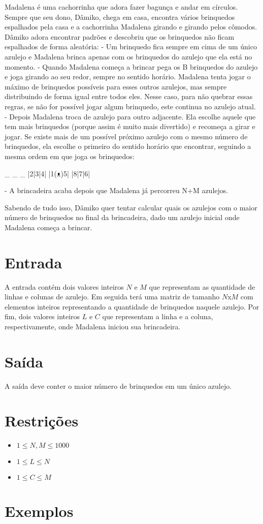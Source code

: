 Madalena é uma cachorrinha que adora fazer bagunça e andar em círculos. Sempre que seu dono, Dâmiko, chega em casa, encontra vários brinquedos espalhados pela casa e a cachorrinha Madalena girando e girando pelos cômodos.
Dâmiko adora encontrar padrões e descobriu que os brinquedos não ficam espalhados de forma aleatória:
- Um brinquedo fica sempre em cima de um único azulejo e Madalena brinca apenas com os brinquedos do azulejo que ela está no momento.
- Quando Madalena começa a brincar pega os B brinquedos do azulejo e joga girando ao seu redor, sempre no sentido horário.
Madalena tenta jogar o máximo de brinquedos possíveis para esses outros azulejos, mas sempre distribuindo de forma igual entre todos eles. Nesse caso, para não quebrar essas regras, se não for possível jogar algum brinquedo, este continua no azulejo atual.
- Depois Madalena troca de azulejo para outro adjacente. Ela escolhe aquele que tem mais brinquedos (porque assim é muito mais divertido) e recomeça a girar e jogar. Se existe mais de um possível próximo azulejo com o mesmo número de brinquedos, ela escolhe o primeiro do sentido horário que encontrar, seguindo a mesma ordem em que joga os brinquedos:

 _ _ _
|2|3|4|
|1(ᴥ)5|
|8|7|6|

- A brincadeira acaba depois que Madalena já percorreu N+M azulejos.

Sabendo de tudo isso, Dâmiko quer tentar calcular quais os azulejos com o maior número de brinquedos no final da brincadeira, dado um azulejo inicial onde Madalena começa a brincar.

\section*{Entrada}

A entrada contém dois valores inteiros $N$ e $M$ que representam as quantidade de linhas e colunas de azulejo. Em seguida terá uma matriz de tamanho $N$x$M$ com elementos inteiros representando a quantidade de brinquedos naquele azulejo.
Por fim, dois valores inteiros $L$ e $C$ que representam a linha e a coluna, respectivamente, onde Madalena iniciou sua brincadeira.

\section*{Saída}

A saída deve conter o maior número de brinquedos em um único azulejo.


\section*{Restrições}

\begin{itemize}
\item $1 \leq N, M \leq 1000$
\item $1 \leq L \leq N$
\item $1 \leq C \leq M$
\end{itemize}


\section*{Exemplos}

\exemplo

